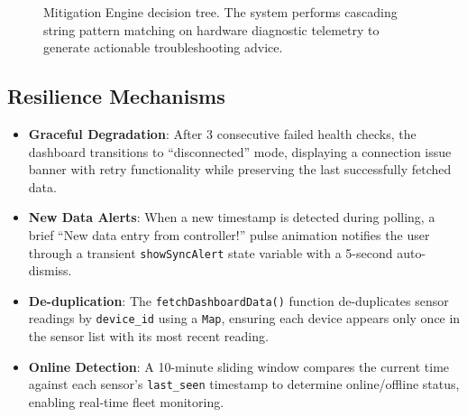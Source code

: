 \documentclass[12pt,a4paper]{article}
\begin{document}
\begin{figure}[H]
\centering
{}
\caption{Mitigation Engine decision tree. The system performs cascading string pattern matching on hardware diagnostic telemetry to generate actionable troubleshooting advice.}
\label{fig:mitigation}
\end{figure}

\subsection{Resilience Mechanisms}
\begin{itemize}[nosep]
    \item \textbf{Graceful Degradation}: After 3 consecutive failed health checks, the dashboard transitions to ``disconnected'' mode, displaying a connection issue banner with retry functionality while preserving the last successfully fetched data.
    \item \textbf{New Data Alerts}: When a new timestamp is detected during polling, a brief ``New data entry from controller!'' pulse animation notifies the user through a transient \texttt{showSyncAlert} state variable with a 5-second auto-dismiss.
    \item \textbf{De-duplication}: The \texttt{fetchDashboardData()} function de-duplicates sensor readings by \texttt{device\_id} using a \texttt{Map}, ensuring each device appears only once in the sensor list with its most recent reading.
    \item \textbf{Online Detection}: A 10-minute sliding window compares the current time against each sensor's \texttt{last\_seen} timestamp to determine online/offline status, enabling real-time fleet monitoring.
\end{itemize}
\end{document}
